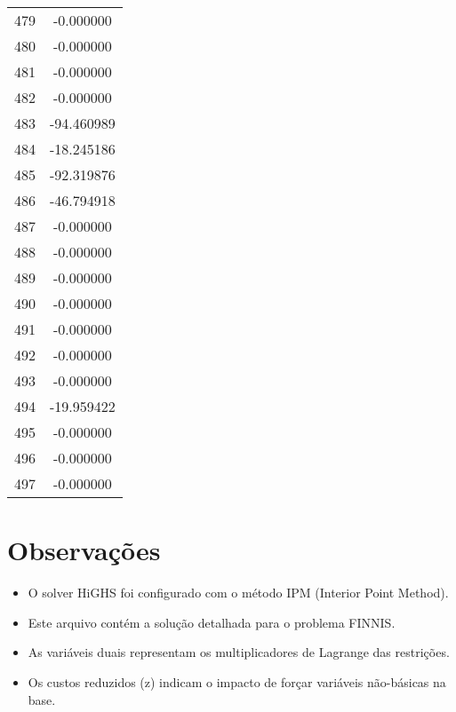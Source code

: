 \documentclass[12pt]{article}
\begin{document}
\begin{longtable}{@{}cc@{}}
479 & -0.000000 \\
480 & -0.000000 \\
481 & -0.000000 \\
482 & -0.000000 \\
483 & -94.460989 \\
484 & -18.245186 \\
485 & -92.319876 \\
486 & -46.794918 \\
487 & -0.000000 \\
488 & -0.000000 \\
489 & -0.000000 \\
490 & -0.000000 \\
491 & -0.000000 \\
492 & -0.000000 \\
493 & -0.000000 \\
494 & -19.959422 \\
495 & -0.000000 \\
496 & -0.000000 \\
497 & -0.000000 \\

\end{longtable}


\section{Observações}

\begin{itemize}
\item O solver HiGHS foi configurado com o método IPM (Interior Point Method).
\item Este arquivo contém a solução detalhada para o problema FINNIS.
\item As variáveis duais representam os multiplicadores de Lagrange das restrições.
\item Os custos reduzidos (z) indicam o impacto de forçar variáveis não-básicas na base.
\end{itemize}
\end{document}
